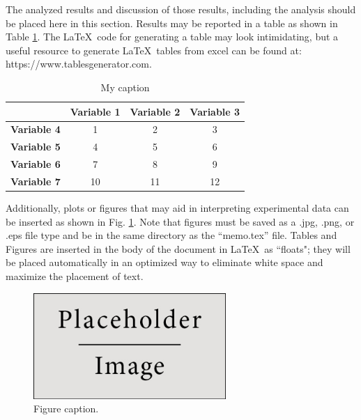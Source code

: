 \documentclass[12pt,letterpaper]{article}
\begin{document}
The analyzed results and discussion of those results, including the analysis should be placed here in this section. Results may be reported in a table as shown in Table \ref{table_lable}.  The \LaTeX\ code for generating a table may look intimidating, but a useful resource to generate \LaTeX\ tables from excel can be found at: https://www.tablesgenerator.com.
\begin{table}[ht]
\centering
\caption{My caption}
\label{table_lable}
\begin{tabular}{c|ccc}
  & \textbf{Variable 1} & \textbf{Variable 2} & \textbf{Variable 3} \\
 \hline
\textbf{Variable 4} & 1 & 2 & 3 \\
\textbf{Variable 5} & 4 & 5 & 6 \\
\textbf{Variable 6} & 7 & 8 & 9 \\
\textbf{Variable 7} & 10 & 11 & 12
\end{tabular}
\end{table}
Additionally, plots or figures that may aid in interpreting experimental data can be inserted as shown in Fig. \ref{placeholderFigure}. Note that figures must be saved as a .jpg, .png, or .eps file type and be in the same directory as the ``memo.tex'' file.  Tables and Figures are inserted in the body of the document in \LaTeX\ as ``floats"; they will be placed automatically in an optimized way to eliminate white space and maximize the placement of text.
\begin{figure}[ht]
\begin{center}
	\includegraphics[width=0.65\textwidth]{placeholder} %
	\caption{Figure caption.}
	\label{placeholderFigure}
\end{center}
\end{figure}	


\end{document}

